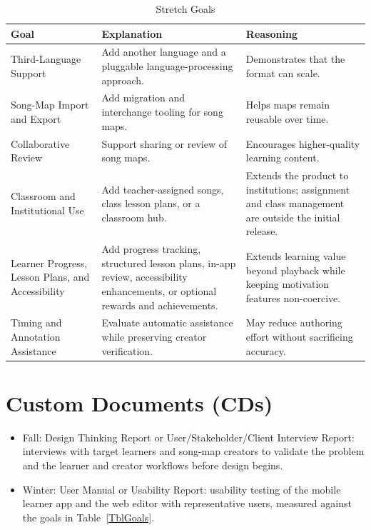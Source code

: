 \documentclass{article}
\begin{document}
\begin{table}[hp]
\caption{Stretch Goals}
\begin{tabularx}{\textwidth}{lXX} \\[-8pt]
\toprule
\textbf{Goal} & \textbf{Explanation} & \textbf{Reasoning}\\
\midrule
Third-Language Support & Add another language and a pluggable language-processing approach. & Demonstrates that the format can scale.\\
Song-Map Import and Export & Add migration and interchange tooling for song maps. & Helps maps remain reusable over time.\\
Collaborative Review & Support sharing or review of song maps. & Encourages higher-quality learning content.\\
Classroom and Institutional Use & Add teacher-assigned songs, class lesson plans, or a classroom hub. & Extends the product to institutions; assignment and class management are outside the initial release.\\
Learner Progress, Lesson Plans, and Accessibility & Add progress tracking, structured lesson plans, in-app review, accessibility enhancements, or optional rewards and achievements. & Extends learning value beyond playback while keeping motivation features non-coercive.\\
Timing and Annotation Assistance & Evaluate automatic assistance while preserving creator verification. & May reduce authoring effort without sacrificing accuracy.\\
\bottomrule
\end{tabularx}
\end{table}

\newpage

\section{Custom Documents (CDs)}
\begin{itemize}
  \item Fall: Design Thinking Report or User/Stakeholder/Client Interview Report: interviews
        with target learners and song-map creators to validate the problem and
        the learner and creator workflows before design begins.
  \item Winter: User Manual or Usability Report: usability testing of the mobile
        learner app and the web editor with representative users, measured
        against the goals in Table~\ref{TblGoals}.
\end{itemize}
\end{document}

